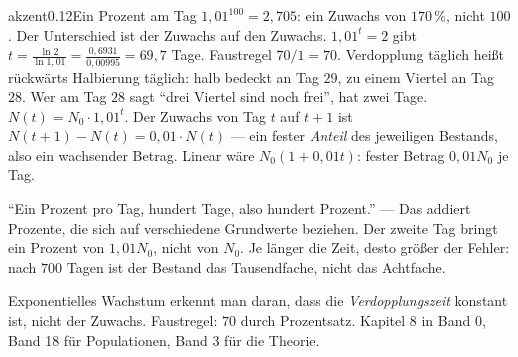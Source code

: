 \begin{loesungkarte}{akzent}{0.12}{Ein Prozent am Tag}
$1{,}01^{100} = 2{,}705$: ein Zuwachs von $170\,\%$, nicht $100$. Der Unterschied ist der Zuwachs auf den Zuwachs.
$1{,}01^{t} = 2$ gibt $t = \frac{\ln2}{\ln1{,}01} = \frac{0{,}6931}{0{,}00995} = 69{,}7$ Tage. Faustregel $70/1 = 70$. \checkmark
{}
Verdopplung täglich heißt rückwärts Halbierung täglich: halb bedeckt an Tag $29$, zu einem Viertel an Tag $28$. Wer am Tag $28$ sagt \enquote{drei Viertel sind noch frei}, hat zwei Tage.
$N(t) = N_0\cdot1{,}01^{t}$. Der Zuwachs von Tag $t$ auf $t + 1$ ist $N(t + 1) - N(t) = 0{,}01\cdot N(t)$ --- ein fester \emph{Anteil} des jeweiligen Bestands, also ein wachsender Betrag. Linear wäre $N_0(1 + 0{,}01t)$: fester Betrag $0{,}01N_0$ je Tag.
\begin{center}
\end{center}
\begin{fehler}\kastentext
\enquote{Ein Prozent pro Tag, hundert Tage, also hundert Prozent.} --- Das addiert Prozente, die sich auf verschiedene Grundwerte beziehen. Der zweite Tag bringt ein Prozent von $1{,}01N_0$, nicht von $N_0$. Je länger die Zeit, desto größer der Fehler: nach $700$ Tagen ist der Bestand das Tausendfache, nicht das Achtfache.
\end{fehler}
\begin{mitnehmen}\kastentext
Exponentielles Wachstum erkennt man daran, dass die \emph{Verdopplungszeit} konstant ist, nicht der Zuwachs. Faustregel: $70$ durch Prozentsatz. Kapitel 8 in Band 0, Band 18 für Populationen, Band 3 für die Theorie.
\end{mitnehmen}
\end{loesungkarte}

